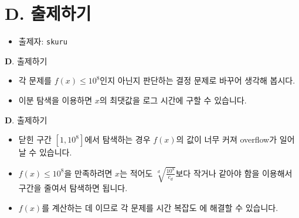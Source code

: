 \section{D. 출제하기}

\begin{frame} %
    \begin{itemize}
        \item 출제자: \texttt{skuru}
    \end{itemize}
\end{frame}

\begin{frame}{\textbf{D}. 출제하기}
    \begin{itemize}
        \item 각 문제를 $f(x) \le 10^8$인지 아닌지 판단하는 결정 문제로 바꾸어 생각해 봅시다.
        \item 이분 탐색을 이용하면 $x$의 최댓값을 로그 시간에 구할 수 있습니다.
    \end{itemize}
\end{frame}

\begin{frame}{\textbf{D}. 출제하기}
    \begin{itemize}
        \item 닫힌 구간 $[1, 10^8]$에서 탐색하는 경우 $f(x)$의 값이 너무 커져 overflow가 일어날 수 있습니다.
        \item $f(x) \le 10^8$을 만족하려면 $x$는 적어도 $\sqrt[d]{\frac{10^8}{c_d}}$보다 작거나 같아야 함을 이용해서 구간을 줄여서 탐색하면 됩니다.
        \item $f(x)$를 계산하는 데 이므로 각 문제를 시간 복잡도 에 해결할 수 있습니다.
    \end{itemize}
\end{frame}
